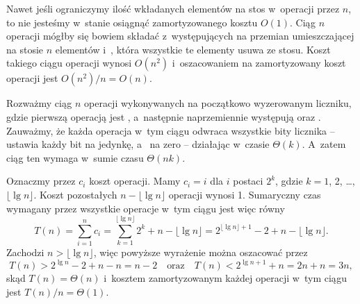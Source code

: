 
\exercise %
Nawet jeśli ograniczymy ilość wkładanych elementów na stos w~operacji  przez $n$, to nie jesteśmy w~stanie osiągnąć zamortyzowanego kosztu $O(1)$.
Ciąg $n$ operacji mógłby się bowiem składać z~występujących na przemian  umieszczającej na stosie $n$ elementów i~, która wszystkie te elementy usuwa ze stosu.
Koszt takiego ciągu operacji wynosi $O(n^2)$ i~oszacowaniem na zamortyzowany koszt operacji jest $O(n^2)/n=O(n)$.

\exercise %
Rozważmy ciąg $n$ operacji wykonywanych na początkowo wyzerowanym liczniku, gdzie pierwszą operacją jest , a~następnie naprzemiennie występują  oraz .
Zauważmy, że każda operacja w~tym ciągu odwraca wszystkie bity licznika --  ustawia każdy bit na jedynkę, a~ na zero -- działając w~czasie $\Theta(k)$.
A~zatem ciąg ten wymaga w~sumie czasu $\Theta(nk)$.

\exercise %
Oznaczmy przez $c_i$ koszt  operacji.
Mamy $c_i=i$ dla $i$ postaci $2^k$, gdzie $k=1$, 2, \dots, $\lfloor\lg n\rfloor$.
Koszt pozostałych $n-\lfloor\lg n\rfloor$ operacji wynosi 1.
Sumaryczny czas wymagany przez wszystkie operacje w~tym ciągu jest więc równy
\[
	T(n) = \sum_{i=1}^nc_i = \sum_{k=1}^{\lfloor\lg n\rfloor}2^k+n-\lfloor\lg n\rfloor = 2^{\lfloor\lg n\rfloor+1}-2+n-\lfloor\lg n\rfloor.
\]
Zachodzi $n>\lfloor\lg n\rfloor$, więc powyższe wyrażenie można oszacować przez
\[
	T(n) > 2^{\lg n}-2+n-n = n-2 \quad\text{oraz}\quad T(n) < 2^{\lg n+1}+n = 2n+n = 3n,
\]
skąd $T(n)=\Theta(n)$ i~kosztem zamortyzowanym każdej operacji w~tym ciągu jest $T(n)/n=\Theta(1)$.
